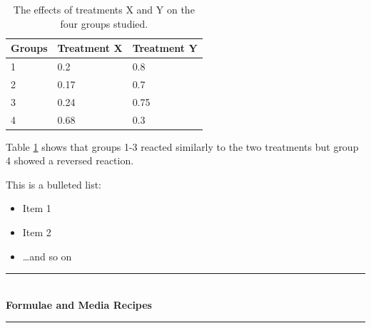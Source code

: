 \documentclass[15pt,idxtotoc,hyperref,openany]{labbook} %
\newcommand{\HRule}{\rule{\linewidth}{0.5mm}} %
\begin{document}
\begin{table}[H]
\begin{tabular}{l l l}
\toprule
\textbf{Groups} & \textbf{Treatment X} & \textbf{Treatment Y} \\
\toprule
1 & 0.2 & 0.8\\
2 & 0.17 & 0.7\\
3 & 0.24 & 0.75\\
4 & 0.68 & 0.3\\
\bottomrule
\end{tabular}
\caption{The effects of treatments X and Y on the four groups studied.}
\label{tab:treatments_xy}
\end{table}

Table \ref{tab:treatments_xy} shows that groups 1-3 reacted similarly to the two treatments but group 4 showed a reversed reaction.




This is a bulleted list:

\begin{itemize}
\item Item 1
\item Item 2
\item \ldots and so on
\end{itemize}



\lipsum[6]



\lipsum[7]


\labday{} %

\begin{center}
\HRule \\[0.4cm]
{\huge \textbf{Formulae and Media Recipes}}\\[0.4cm] %
\HRule \\[1.5cm]
\end{center}
\end{document}
